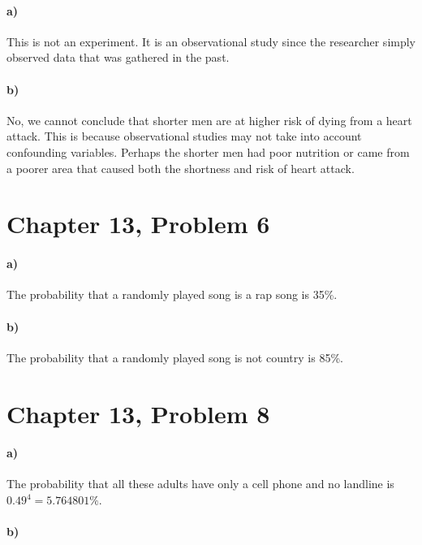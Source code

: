 \documentclass[12pt]{article}
\begin{document}
\paragraph{a)}

This is not an experiment. It is an observational study since the researcher simply
observed data that was gathered in the past.

\paragraph{b)}

No, we cannot conclude that shorter men are at higher risk of dying from a heart attack.
This is because observational studies may not take into account confounding variables.
Perhaps the shorter men had poor nutrition or came from a poorer area that caused
both the shortness and risk of heart attack.

\section*{Chapter 13, Problem 6}

\paragraph{a)}

The probability that a randomly played song is a rap song is 35\%.

\paragraph{b)}

The probability that a randomly played song is not country is 85\%.

\section*{Chapter 13, Problem 8}

\paragraph{a)}

The probability that all these adults have only a cell phone and no
landline is \(0.49^4=5.764801\%\).

\paragraph{b)}
\end{document}
